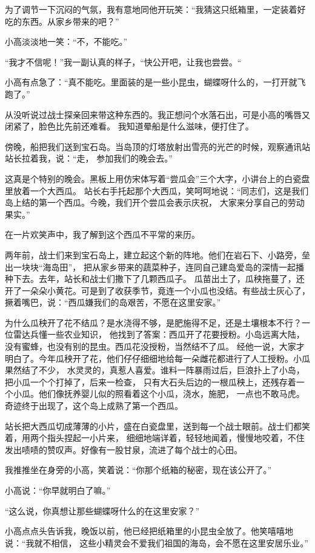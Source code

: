 \documentclass[12pt,UTF8]{ctexbook}
\begin{document}
为了调节一下沉闷的气氛，我有意地同他开玩笑：“我猜这只纸箱里，一定装着好吃的东西。从家乡带来的吧？”

小高淡淡地一笑：“不，不能吃。”

“我才不信呢！”我一副认真的样子，“快公开吧，让我也尝尝。“

小高有点急了：“真不能吃。里面装的是一些小昆虫，蝴蝶呀什么的，一打开就飞跑了。”

从没听说过战士探亲回来带这种东西的。我正想问个水落石出，可是小高的嘴唇又闭紧了，脸色比先前还难看。
我知道晕船是什么滋味，便打住了。

傍晚，船把我们送到宝石岛。当岛顶的灯塔放射出雪亮的光芒的时候，观察通讯站站长拉着我，说：“走，
参加我们的晚会去。”

这真是个特别的晚会。黑板上用仿宋体写着“尝瓜会”三个大字，小讲台上的白瓷盘里放着一个大西瓜。
站长右手托起那个大西瓜，笑呵呵地说：“同志们，这是我们岛上结的第一个西瓜。今晚，我们开个尝瓜会表示庆祝，
大家来分享自己的劳动果实。”

在一片欢笑声中，我了解到这个西瓜不平常的来历。

两年前，战士们来到宝石岛上，建立起这个新的阵地。他们在岩石下、小路旁，垒出一块块“海岛田”，
把从家乡带来的蔬菜种子，连同自己建岛爱岛的深情一起播种下去。去年，站长和战士们撒下了几颗西瓜子。
瓜苗出土了，瓜秧拖蔓了，还开了一朵朵小黄花。可是到了收获季节，竟连一个小瓜也没结。有些战士灰心了，
撅着嘴巴，说：“西瓜嫌我们的岛艰苦，不愿在这里安家。”

为什么瓜秧开了花不结瓜？是水浇得不够，是肥施得不足，还是土壤根本不行？一位雷达兵懂一些农业知识，
他找到了答案：西瓜开了花要授粉。小岛远离大陆，没有蜜蜂，也没有别的昆虫。西瓜花没授粉，当然结不了瓜。
经他一说，大家才明白了。今年瓜秧开了花，他们仔仔细细地给每一朵雌花都进行了人工授粉。小瓜果然结了不少，
水灵灵的，真惹人喜爱。谁料一阵暴雨过后，巨浪扑上了小岛，把小瓜一个个打掉了，后来一检查，
只有大石头后边的一根瓜秧上，还残存着一个小瓜。他们像抚养婴儿似的照看着这个小瓜，浇水，施肥，
一点也不敢马虎。奇迹终于出现了，这个岛上成熟了第一个西瓜。

站长把大西瓜切成薄薄的小片，盛在白瓷盘里，送到每一个战士眼前。战士们都笑着，用两个指头捏起一小片来，
细细地端详着，轻轻地闻着，慢慢地咬着，不住发出啧啧的赞叹声。好像有一股甘泉，流进了每个战士的心田。

我推推坐在身旁的小高，笑着说：“你那个纸箱的秘密，现在该公开了。”

小高说：“你早就明白了嘛。”

“这么说，你真想让那些蝴蝶呀什么的在这里安家？”

小高点点头告诉我，晚饭以前，他已经把纸箱里的小昆虫全放了。他笑嘻嘻地说：“我就不相信，
这些小精灵会不爱我们祖国的海岛，会不愿在这里安居乐业。”
\end{document}
